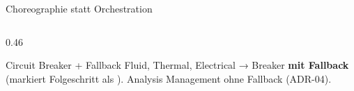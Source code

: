 \begin{frame}{Choreographie statt Orchestration}
\begin{columns}[T,onlytextwidth]
\begin{column}{0.46\textwidth}
      \vspace*{-0.2cm}
      \begin{block}{Circuit Breaker + Fallback}
        \small Fluid, Thermal, Electrical → Breaker \textbf{mit Fallback} (markiert Folgeschritt als ).
        Analysis Management ohne Fallback (ADR-04).
      \end{block}
    \end{column}
  \end{columns}
\end{frame}
